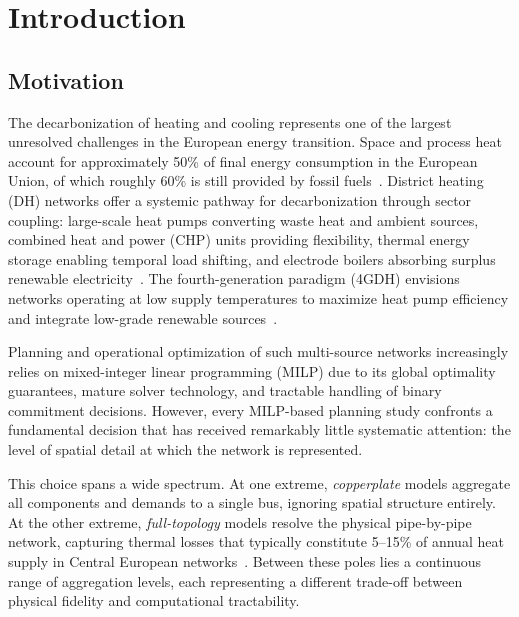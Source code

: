 \documentclass[review,3p]{elsarticle}
\begin{document}
\section{Introduction}
\label{sec:introduction}

\subsection{Motivation}
\label{sec:motivation}

The decarbonization of heating and cooling represents one of the
largest unresolved challenges in the European energy transition.
Space and process heat account for approximately 50\% of final
energy consumption in the European Union, of which roughly
60\% is still provided by fossil fuels~\cite{EUheating2016}.
District heating (DH) networks offer a systemic pathway for
decarbonization through sector coupling: large-scale heat pumps
converting waste heat and ambient sources, combined heat and
power (CHP) units providing flexibility, thermal energy storage
enabling temporal load shifting, and electrode boilers absorbing
surplus renewable electricity~\cite{Lund2014_4GDH,Werner2017}.
The fourth-generation paradigm (4GDH) envisions networks operating
at low supply temperatures to maximize heat pump efficiency and
integrate low-grade renewable sources~\cite{Lund2014_4GDH,Buffa2019}.

Planning and operational optimization of such multi-source networks
increasingly relies on mixed-integer linear programming (MILP)
due to its global optimality guarantees, mature solver technology,
and tractable handling of binary commitment decisions. However,
every MILP-based planning study confronts a fundamental decision
that has received remarkably little systematic attention: the level
of spatial detail at which the network is represented.

This choice spans a wide spectrum. At one extreme,
\emph{copperplate} models aggregate all components and demands
to a single bus, ignoring spatial structure entirely. At the
other extreme, \emph{full-topology} models resolve the physical
pipe-by-pipe network, capturing thermal losses that typically
constitute 5--15\% of annual heat supply in Central European
networks~\cite{Frederiksen2013,Talebi2016}.
Between these poles lies a continuous range of aggregation levels,
each representing a different trade-off between physical fidelity
and computational tractability.
\end{document}
